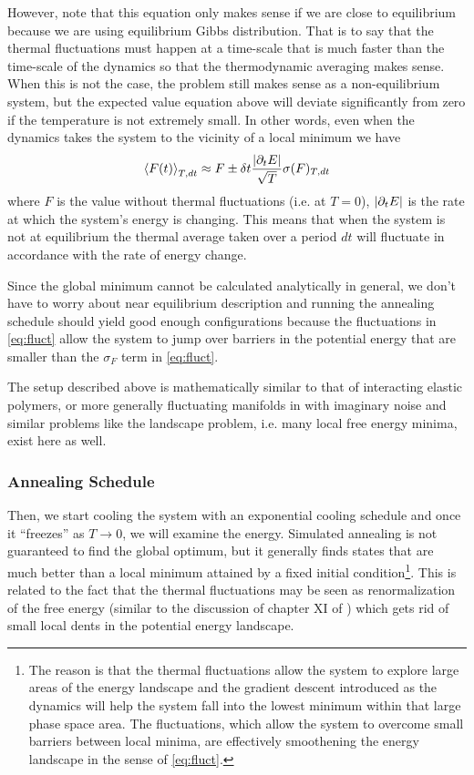 \documentclass[nofootinbib,preprint,floatfix,titlepage,endfloats,superscriptaddress]{revtex4} %
\begin{document}
However, note that this equation only makes sense if we are close to equilibrium because we are using equilibrium Gibbs distribution. That is to say that the thermal fluctuations must happen at a time-scale that is much faster than the time-scale of the dynamics so that the thermodynamic averaging makes sense. When this is not the case, the problem still makes sense as a non-equilibrium system, but the expected value equation above will deviate significantly from zero if the temperature is not extremely small. In other words, even when the dynamics takes the system to the vicinity of a local minimum we have 
\begin{equation}
\left<F(t)\right>_{T,dt} \approx F \pm \delta t {|\partial_t E|\over \sqrt{T}} \sigma(F)_{T,dt} \label{eq:fluct}  
\end{equation}
where $F$ is the value without thermal fluctuations (i.e. at $T=0$), $|\partial_t E|$ is the rate at which the system's energy is changing. This means that when the system is not at equilibrium the thermal average taken over a period $dt$ will fluctuate in accordance with the rate of energy change. 



Since the global minimum cannot be calculated analytically in general, we don't have to worry about near equilibrium description and running the annealing schedule should yield good enough configurations because the fluctuations in \eqref{eq:fluct} allow the system to jump over barriers in the potential energy that are smaller than the $\sigma_F$ term in \eqref{eq:fluct}. 

The setup described above is mathematically similar to that of interacting elastic polymers, or more generally fluctuating manifolds in \cite{mezard1991replica} with imaginary noise and similar problems like the landscape problem, i.e. many local free energy minima, exist here as well. 

\subsubsection{Annealing Schedule}
Then, we start cooling the system with an exponential cooling schedule and once it ``freezes'' as $T \to 0$, we will examine the energy. Simulated annealing is not guaranteed to find the global optimum, but it generally finds states that are much better than a local minimum attained by a fixed initial condition\footnote{ The reason is that the thermal fluctuations allow the system to explore large areas of the energy landscape and the gradient descent introduced as the dynamics will help the system fall into the lowest minimum within that large phase space area. The fluctuations, which allow the system to overcome small barriers between local minima, are effectively smoothening the energy landscape in the sense of \eqref{eq:fluct}. }. This is related to the fact that the thermal fluctuations may be seen as renormalization of the free energy (similar to the discussion of chapter XI of \cite{de1979scaling}) which gets rid of small local dents in the potential energy landscape.  
\end{document}
